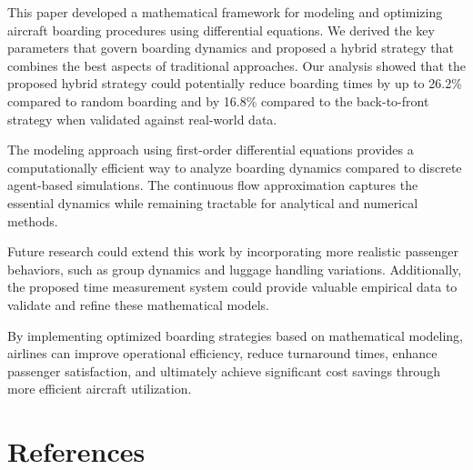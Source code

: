 \documentclass[12pt]{article}
\begin{document}
This paper developed a mathematical framework for modeling and optimizing aircraft boarding procedures using differential equations. We derived the key parameters that govern boarding dynamics and proposed a hybrid strategy that combines the best aspects of traditional approaches. Our analysis showed that the proposed hybrid strategy could potentially reduce boarding times by up to 26.2\% compared to random boarding and by 16.8\% compared to the back-to-front strategy when validated against real-world data.

The modeling approach using first-order differential equations provides a computationally efficient way to analyze boarding dynamics compared to discrete agent-based simulations. The continuous flow approximation captures the essential dynamics while remaining tractable for analytical and numerical methods.

Future research could extend this work by incorporating more realistic passenger behaviors, such as group dynamics and luggage handling variations. Additionally, the proposed time measurement system could provide valuable empirical data to validate and refine these mathematical models.

By implementing optimized boarding strategies based on mathematical modeling, airlines can improve operational efficiency, reduce turnaround times, enhance passenger satisfaction, and ultimately achieve significant cost savings through more efficient aircraft utilization.

\section*{References}
\end{document}
